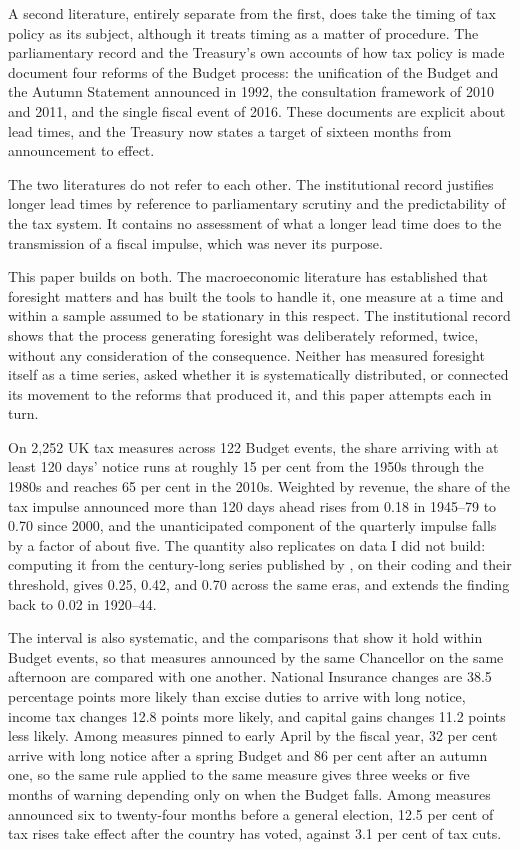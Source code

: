 \documentclass[11pt,a4paper]{article}
\begin{document}
A second literature, entirely separate from the first, does take the timing of tax policy as its
subject, although it treats timing as a matter of procedure. The parliamentary record and the
Treasury's own accounts of how tax policy is made document four reforms of the Budget process: the
unification of the Budget and the Autumn Statement announced in 1992, the consultation framework of
2010 and 2011, and the single fiscal event of 2016. These documents are explicit about lead times,
and the Treasury now states a target of sixteen months from announcement to effect.

The two literatures do not refer to each other. The institutional record justifies longer lead times
by reference to parliamentary scrutiny and the predictability of the tax system. It contains no assessment of what a longer lead time does to the transmission of a fiscal impulse, which was never
its purpose.

This paper builds on both. The macroeconomic literature has established that foresight matters and
has built the tools to handle it, one measure at a time and within a sample assumed to be stationary in this respect. The institutional record shows that the process generating foresight was
deliberately reformed, twice, without any consideration of the consequence. Neither has measured
foresight itself as a time series, asked whether it is systematically distributed, or connected its
movement to the reforms that produced it, and this paper attempts each in turn.

On 2,252 UK tax measures across 122 Budget events, the share arriving with at least 120 days' notice runs at roughly 15 per cent from the 1950s through the 1980s and reaches 65 per cent in the 2010s. Weighted by revenue, the share
of the tax impulse announced more than 120 days ahead rises from 0.18 in 1945--79 to 0.70 since 2000,
and the unanticipated component of the quarterly impulse falls by a factor of about five. The quantity also replicates on data I did not build: computing it from the century-long series published by \citet{cloyne2025}, on their coding and their threshold, gives 0.25, 0.42, and 0.70 across the same eras, and extends the finding back to 0.02 in 1920--44.

The interval is also systematic, and the comparisons that show it hold within Budget events, so that
measures announced by the same Chancellor on the same afternoon are compared with one another.
National Insurance changes are 38.5 percentage points more likely than excise duties to arrive with
long notice, income tax changes 12.8 points more likely, and capital gains changes 11.2 points less
likely. Among measures pinned to early April by the fiscal year, 32 per cent arrive with long notice
after a spring Budget and 86 per cent after an autumn one, so the same rule applied to the same
measure gives three weeks or five months of warning depending only on when the Budget falls. Among
measures announced six to twenty-four months before a general election, 12.5 per cent of tax rises
take effect after the country has voted, against 3.1 per cent of tax cuts.
\end{document}
